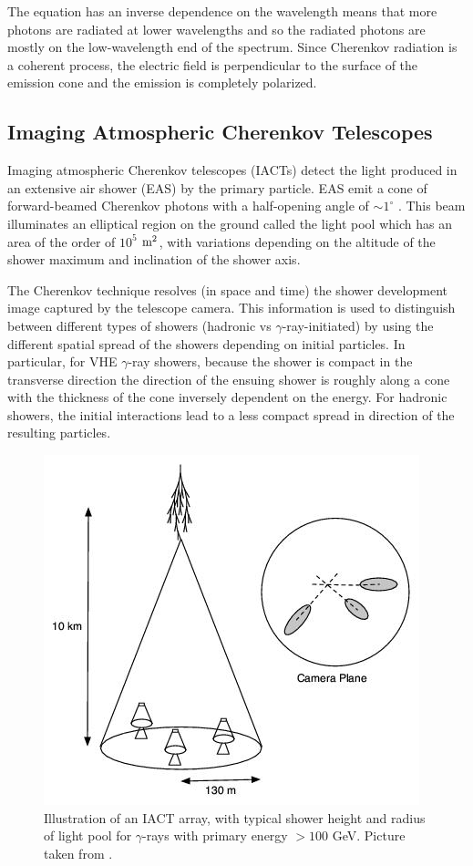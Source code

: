 \documentclass[main.tex]{subfiles}
\begin{document}
The equation has an inverse dependence on the wavelength means that more photons are radiated at lower wavelengths and so the radiated photons are mostly on the low-wavelength end of the spectrum. Since Cherenkov radiation is a coherent process, the electric field is perpendicular to the surface of the emission cone and the emission is completely polarized.

\subsection{Imaging Atmospheric Cherenkov Telescopes}
Imaging atmospheric Cherenkov telescopes (IACTs) detect the light produced in an extensive air shower (EAS) by the primary particle. EAS emit a cone of forward-beamed Cherenkov photons with a half-opening angle of $\sim 1^\circ$ \cite{antonelli2009}. This beam illuminates an elliptical region on the ground called the light pool which has an area of the order of $10^5$ $\textrm{m}^2$, with variations depending on the altitude of the shower maximum and inclination of the shower axis. \par
The Cherenkov technique resolves (in space and time) the shower development image captured by the telescope camera. This information is used to distinguish between different types of showers (hadronic vs $\gamma$-ray-initiated) by using the different spatial spread of the showers depending on initial particles. In particular, for VHE $\gamma$-ray showers, because the shower is compact in the transverse direction the direction of the ensuing shower is roughly along a cone with the thickness of the cone inversely dependent on the energy. %
 For hadronic showers, the initial interactions lead to a less compact spread in direction of the resulting particles.\par
\begin{figure}[htbp]
  \centering
  \includegraphics[width=0.68\linewidth]{images/IACT}
  \caption[Illustration of an IACT array.]{Illustration of an IACT array, with typical shower height and radius of light pool for $\gamma$-rays with primary energy $>100$ GeV. Picture taken from \cite{veritas_web}.}
  \label{fig:IACT}
\end{figure}
\end{document}
